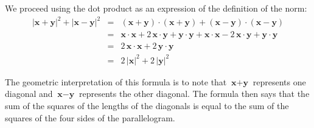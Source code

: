 \documentclass[11pt,reqno]{article}
\begin{document}
We proceed using the dot product as an expression of the definition of the norm:
\begin{eqnarray*}
 |\textbf{x} + \textbf{y}|^2 + |\textbf{x} - \textbf{y}|^2 & = & (\textbf{x} + \textbf{y}) \cdot (\textbf{x} + \textbf{y})  +  (\textbf{x} - \textbf{y}) \cdot (\textbf{x} - \textbf{y})    \\
   &=& \textbf{x}\cdot \textbf{x} + 2 \, \textbf{x}\cdot \textbf{y} + \textbf{y}\cdot \textbf{y} + \textbf{x}\cdot \textbf{x} - 2 \, \textbf{x}\cdot \textbf{y} + \textbf{y}\cdot \textbf{y}  \\
   &=& 2\, \textbf{x}\cdot \textbf{x} + 2\, \textbf{y}\cdot \textbf{y} \\
   &=& 2\,|\textbf{x}|^2 + 2\,|\textbf{y}|^2
\end{eqnarray*}

The geometric interpretation of this formula is to note that $\textbf{x} + \textbf{y}$ represents one diagonal and $\textbf{x} - \textbf{y}$ represents the other diagonal. The formula then says that the sum of the squares of the lengths of the diagonals is equal to the sum of the squares of the four sides of the parallelogram.




\end{document}
